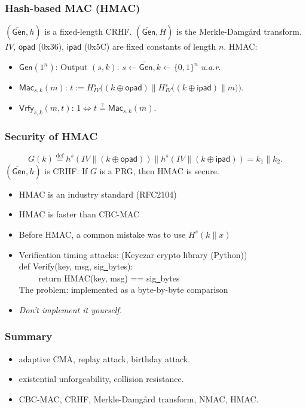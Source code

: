 \begin{frame}\frametitle{Hash-based MAC (HMAC)}
\begin{figure}
\begin{center}

\end{center}
\end{figure}
\begin{construction}
$(\widetilde{\mathsf{Gen}}, h)$ is a fixed-length CRHF. $(\widetilde{\mathsf{Gen}}, H)$ is the Merkle-Damg\r{a}rd transform.
$IV$, $\mathsf{opad}$ (0x36), $\mathsf{ipad}$ (0x5C) are fixed constants of length $n$.
HMAC:
\begin{itemize}
\item $\mathsf{Gen}(1^n)$: Output $(s, k)$. $s \gets \widetilde{\mathsf{Gen}}, k \gets \{0,1\}^n$ \emph{u.a.r}.
\item $\mathsf{Mac}_{s,k}(m)$: $t := H_{IV}^s\Big((k \oplus \mathsf{opad}) \| H_{IV}^s\big((k \oplus \mathsf{ipad}) \| m\big)\Big)$.
\item $\mathsf{Vrfy}_{s,k}(m,t)$: $1 \iff t \overset{?}{=} \mathsf{Mac}_{s,k}(m)$.
\end{itemize}
\end{construction}
\end{frame}
\begin{frame}\frametitle{Security of HMAC}
\begin{theorem}
\[ G(k) \overset{\text{def}}{=} h^s(IV\| (k\oplus \mathsf{opad})) \| 
h^s(IV\| (k\oplus \mathsf{ipad})) = k_1\| k_2.
\]
$(\widetilde{\mathsf{Gen}}, h)$ is CRHF. If $G$ is a PRG, then HMAC is secure.
\end{theorem}
\begin{itemize}
\item HMAC is an industry standard (RFC2104)
\item HMAC is faster than CBC-MAC
\item Before HMAC, a common mistake was to use $H^s(k\| x)$
\item \alert{Verification timing attacks: (Keyczar crypto library (Python))} \\
def Verify(key, msg, sig\underline{\ }bytes): \\
$\qquad$ return HMAC(key, msg) == sig\underline{\ }bytes \\
The problem:  implemented as a byte-by-byte comparison
\item \alert{\emph{Don't implement it yourself.}}
\end{itemize}
\end{frame}
\begin{frame}\frametitle{Summary}
\begin{itemize}
\item adaptive CMA, replay attack, birthday attack. 
\item existential unforgeability, collision resistance.
\item CBC-MAC, CRHF, Merkle-Damg\r{a}rd transform, NMAC, HMAC. 
\end{itemize}
\end{frame}

